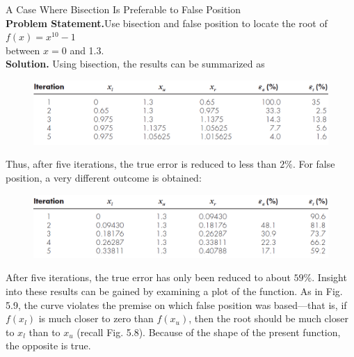\documentclass[../main.tex]{subfiles}
\begin{document}
\begin{example} A Case Where Bisection Is Preferable to False Position\\

    \noindent\textbf{Problem Statement.}\quad  Use bisection and false position to locate the root of\\

    $f(x)=x^{10}-1$\\

    \noindent between $x = 0$ and 1.3.\\

    \noindent\textbf{Solution.} Using bisection, the results can be summarized as

    \begin{figure}[h]
        \includegraphics[width=0.8\linewidth]{./images/example_5_6_1}
    \end{figure}

    \noindent Thus, after five iterations, the true error is reduced to less than $2\%$. For false position, a
    very different outcome is obtained:\\

    \begin{figure}[h]
        \includegraphics[width=0.8\linewidth]{./images/example_5_6_2}
    \end{figure}

    After five iterations, the true error has only been reduced to about $59\%$. Insight into
    these results can be gained by examining a plot of the function. As in Fig. 5.9, the curve
    violates the premise on which false position was based---that is, if $f (x_l )$ is much closer to
    zero than $f (x_u)$, then the root should be much closer to $x_l$ than to $x_u$ (recall Fig. 5.8). Because
    of the shape of the present function, the opposite is true.\\


\end{example}
\end{document}
